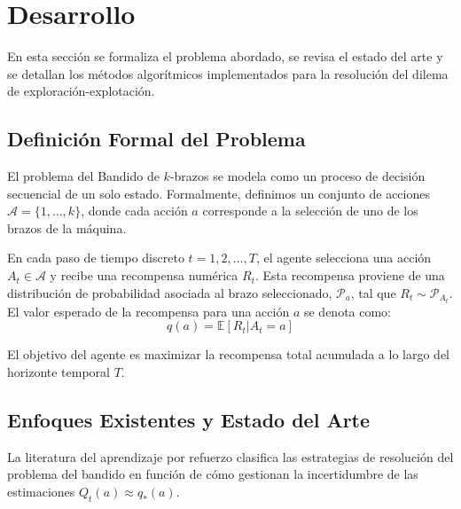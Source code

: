 \section{Desarrollo}

En esta sección se formaliza el problema abordado, se revisa el estado del arte y se 
detallan los métodos algorítmicos implementados para la resolución del dilema de exploración-explotación.

\subsection{Definición Formal del Problema}
El problema del Bandido de $k$-brazos se modela como un proceso de decisión 
secuencial de un solo estado. Formalmente, definimos un conjunto de acciones 
$\mathcal{A} = \{1, \dots, k\}$, donde cada acción $a$ corresponde a la selección de uno de los brazos de la máquina.

En cada paso de tiempo discreto $t = 1, 2, \dots, T$, el agente selecciona una acción $A_t \in \mathcal{A}$ y 
recibe una recompensa numérica $R_t$. Esta recompensa proviene de una distribución de probabilidad 
asociada al brazo seleccionado, $\mathcal{P}_a$, tal que $R_t \sim \mathcal{P}_{A_t}$. 
El valor esperado de la recompensa para una acción $a$ se denota como:
\begin{equation*}
    q(a) = \mathbb{E}[R_t | A_t = a] 
\end{equation*}

El objetivo del agente es maximizar la recompensa total acumulada a lo largo del horizonte temporal $T$.

\subsection{Enfoques Existentes y Estado del Arte}
La literatura del aprendizaje por refuerzo clasifica las estrategias de resolución del problema del bandido en función de cómo gestionan la incertidumbre de las estimaciones $Q_t(a) \approx q_*(a)$.

